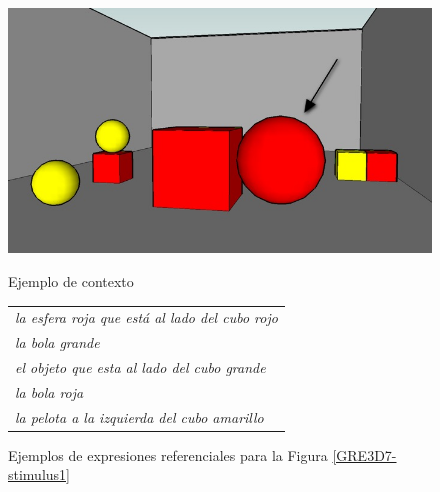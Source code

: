 \begin{figure}[!ht]
\begin{minipage}[t]{0.5\linewidth}
\centering
\includegraphics[width=\textwidth]{images/22sinletras.jpg}
\caption{Ejemplo de contexto}
\label{GRE3D7-stimulus1}

\end{minipage}
\hspace*{0cm}
\begin{minipage}[t]{0.5\linewidth}
\centering
\vspace*{-4cm}
\begin{tabular}{l}
 {\it la esfera roja que est\'a al lado del cubo rojo} \\

 {\it la bola grande}\\

 {\it el objeto que esta al lado del cubo grande}\\

 {\it la bola roja}\\

 {\it la pelota a la izquierda del cubo amarillo}\\
 \end{tabular}
\vspace*{1.5cm}
\caption{Ejemplos de expresiones referenciales para la Figura \ref{GRE3D7-stimulus1}}
 \label{er-figura1}
\end{minipage}
\end{figure}

%



